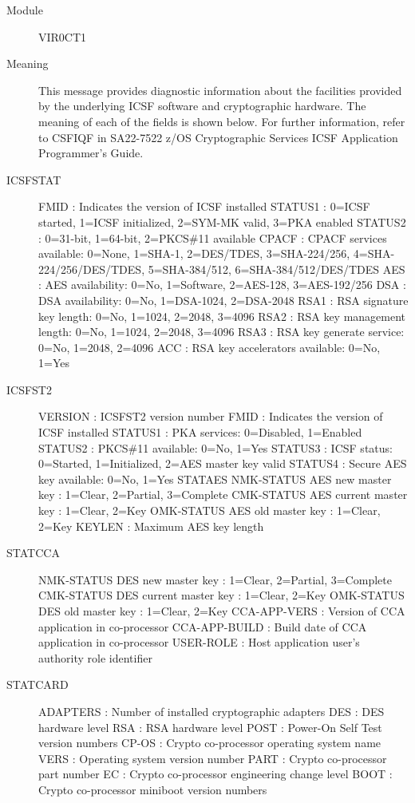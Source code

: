 \documentclass[letterpaper,10pt,english]{sphinxmanual}
\begin{document}
\begin{description}
\item[{Module}] \leavevmode
VIR0CT1

\item[{Meaning}] \leavevmode
This message provides diagnostic information about the facilities provided by the underlying ICSF software and cryptographic hardware. The meaning of each of the fields is shown below. For further information, refer to CSFIQF in SA22-7522 z/OS Cryptographic Services ICSF Application Programmer’s Guide.

\item[{ICSFSTAT}] \leavevmode
FMID : Indicates the version of ICSF installed
STATUS1 : 0=ICSF started, 1=ICSF initialized, 2=SYM-MK valid, 3=PKA enabled STATUS2 : 0=31-bit, 1=64-bit, 2=PKCS\#11 available
CPACF : CPACF services available: 0=None, 1=SHA-1, 2=DES/TDES, 3=SHA-224/256, 4=SHA-224/256/DES/TDES, 5=SHA-384/512, 6=SHA-384/512/DES/TDES
AES : AES availability: 0=No, 1=Software, 2=AES-128, 3=AES-192/256 DSA : DSA availability: 0=No, 1=DSA-1024, 2=DSA-2048
RSA1 : RSA signature key length: 0=No, 1=1024, 2=2048, 3=4096 RSA2 : RSA key management length: 0=No, 1=1024, 2=2048, 3=4096 RSA3 : RSA key generate service: 0=No, 1=2048, 2=4096
ACC : RSA key accelerators available: 0=No, 1=Yes

\item[{ICSFST2}] \leavevmode
VERSION : ICSFST2 version number
FMID : Indicates the version of ICSF installed STATUS1 : PKA services: 0=Disabled, 1=Enabled STATUS2 : PKCS\#11 available: 0=No, 1=Yes
STATUS3 : ICSF status: 0=Started, 1=Initialized, 2=AES master key valid STATUS4 : Secure AES key available: 0=No, 1=Yes
STATAES
NMK-STATUS AES new master key : 1=Clear, 2=Partial, 3=Complete CMK-STATUS AES current master key : 1=Clear, 2=Key
OMK-STATUS AES old master key : 1=Clear, 2=Key KEYLEN : Maximum AES key length

\item[{STATCCA}] \leavevmode
NMK-STATUS DES new master key : 1=Clear, 2=Partial, 3=Complete CMK-STATUS DES current master key : 1=Clear, 2=Key
OMK-STATUS DES old master key : 1=Clear, 2=Key
CCA-APP-VERS : Version of CCA application in co-processor CCA-APP-BUILD : Build date of CCA application in co-processor USER-ROLE : Host application user’s authority role identifier

\item[{STATCARD}] \leavevmode
ADAPTERS : Number of installed cryptographic adapters DES : DES hardware level
RSA : RSA hardware level
POST : Power-On Self Test version numbers
CP-OS : Crypto co-processor operating system name VERS : Operating system version number
PART : Crypto co-processor part number
EC : Crypto co-processor engineering change level BOOT : Crypto co-processor miniboot version numbers


\end{description}
\end{document}
